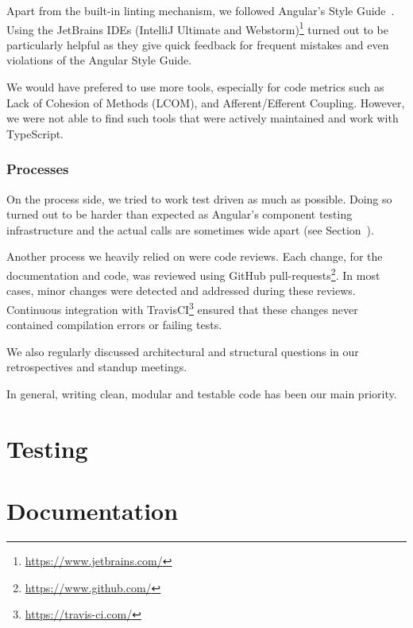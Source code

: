 Apart from the built-in linting mechanism, we followed Angular's Style Guide~\cite{angular-style-guide}.
Using the JetBrains IDEs (IntelliJ Ultimate and Webstorm)\footnote{\url{https://www.jetbrains.com/}} turned out to be particularly helpful as they give quick feedback for frequent mistakes and even violations of the Angular Style Guide.

We would have prefered to use more tools, especially for code metrics such as Lack of Cohesion of Methods (LCOM), and Afferent/Efferent Coupling.
However, we were not able to find such tools that were actively maintained and work with TypeScript.

\subsubsection{Processes}

On the process side, we tried to work test driven as much as possible.
Doing so turned out to be harder than expected as Angular's component testing infrastructure and the actual calls are sometimes wide apart (see Section~).

Another process we heavily relied on were code reviews.
Each change, for the documentation and code, was reviewed using GitHub pull-requests\footnote{\url{https://www.github.com/}}.
In most cases, minor changes were detected and addressed during these reviews.
Continuous integration with TravisCI\footnote{\url{https://travis-ci.com/}} ensured that these changes never contained compilation errors or failing tests.

We also regularly discussed architectural and structural questions in our retrospectives and standup meetings.

In general, writing clean, modular and testable code has been our main priority.

\section{Testing}\label{sec:testing}


\section{Documentation}
